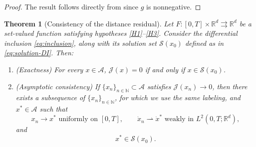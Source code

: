 \documentclass[11pt]{elsarticle}
\newtheorem{theorem}{Theorem}[section]
\theoremstyle{definition}
\theoremstyle{remark}
\numberwithin{equation}{section}
\begin{document}
	\begin{proof}
The result follows directly from \cite[Theorem~3]{ioffe_1977} since $g$ is nonnegative.
	\end{proof}
	
	\begin{theorem}[Consistency of the distance residual] \label{thm:consistency}
		Let $F:[0,T]\times\mathbb{R}^d\rightrightarrows\mathbb{R}^d$ be a set-valued function satisfying hypotheses {\rm \ref{H1}--\ref{H3}}.
		Consider the differential inclusion \eqref{eq:inclusion}, along with its
		solution set $\mathcal{S}(x_0)$ defined as in \eqref{eq:solution-DI}.
		Then:
		\begin{enumerate}
			\item[\rm(a)] (Exactness) For every $x \in \mathcal{A}$, $\mathcal{J}(x) = 0$ if and only if $x \in \mathcal{S}(x_0)$.
			\item[\rm(b)] (Asymptotic consistency) If $\{x_n\}_{n\in\mathbb{N}} \subset \mathcal{A}$ satisfies $\mathcal{J}(x_n) \to 0$, then there exists a subsequence of $\{x_n\}_{n\in\mathbb{N}}$, for which we use the same labeling, and $x^* \in \mathcal{A}$ such that 
			\[ x_n \to x^* \text{ uniformly on }[0,T],
			\qquad
			\dot{x}_n \rightharpoonup \dot{x}^* \text{ weakly in } L^2(0,T; \mathbb{R}^d),
			\]
		 and 
		 \[ 
		 x^* \in \mathcal{S}(x_0).
		 \]
		\end{enumerate}
	\end{theorem}
	
\end{document}
